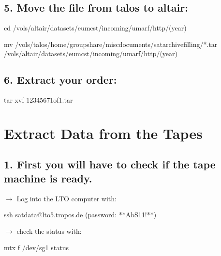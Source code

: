 \documentclass[letterpaper,10pt,english]{sphinxmanual}
\begin{document}
\section{5. Move the file from talos to altair:}
\label{\detokenize{copy_data_HTTP:move-the-file-from-talos-to-altair}}
\begin{sphinxVerbatim}[commandchars=\\\{\}]
cd /vols/altair/datasets/eumcst/incoming/umarf/http/(year)

mv /vols/talos/home/group\PYGZbs{}\PYGZus{}share/misc\PYGZbs{}\PYGZus{}documents/sat\PYGZbs{}\PYGZus{}archive\PYGZbs{}\PYGZus{}filling/\PYGZbs{}*.tar /vols/altair/datasets/eumcst/incoming/umarf/http/(year)
\end{sphinxVerbatim}


\section{6. Extract your order:}
\label{\detokenize{copy_data_HTTP:extract-your-order}}
\begin{sphinxVerbatim}[commandchars=\\\{\}]
tar \PYGZhy{}xvf 1234567\PYGZhy{}1of1.tar
\end{sphinxVerbatim}


\chapter{Extract Data from the Tapes}
\label{\detokenize{extract_tapes:extract-data-from-the-tapes}}\label{\detokenize{extract_tapes::doc}}

\section{1. First you will have to check if the tape machine is ready.}
\label{\detokenize{extract_tapes:first-you-will-have-to-check-if-the-tape-machine-is-ready}}
\(\rightarrow\) Log into the LTO computer with:

\begin{sphinxVerbatim}[commandchars=\\\{\}]
ssh sat\PYGZbs{}\PYGZus{}data\PYGZbs{}@lto5.tropos.de
(password: **AbS11!**)
\end{sphinxVerbatim}

\(\rightarrow\) check the status with:

\begin{sphinxVerbatim}[commandchars=\\\{\}]
mtx \PYGZhy{}f /dev/sg1 status
\end{sphinxVerbatim}
\end{document}
